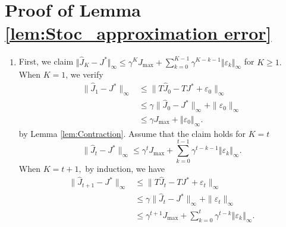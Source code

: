 \documentclass[12pt,technote,onecolumn]{IEEEtran}
\begin{document}
\section*{Proof of Lemma \ref{lem:Stoc_approximation error}}
\begin{IEEEproof}
	\begin{enumerate}
		\item First, we claim $\Vert \widehat{J}_{K}-J^{*}\Vert _{\infty}\leq\gamma^{K}J_{\max}+\sum_{k=0}^{K-1}\gamma^{K-k-1}\Vert\varepsilon_{k}\Vert _{\infty}$
		for $K\geq1.$ When $K=1$, we verify
		\begin{equation*}
		\begin{aligned}
		\|\widehat{J}_{1}-J^{*}\|_{\infty}&\leq\|T\widehat{J}_{0}-TJ^{*}+\varepsilon_{0}\|_{\infty}\\
		&\leq\gamma\|\widehat{J}_{0}-J^{*}\|_{\infty}+\|\varepsilon_{0}\|_{\infty}\\
		&\leq\gamma J_{\max}+\left\Vert \varepsilon_{0}\right\Vert _{\infty}.
		\end{aligned}
		\end{equation*}
		by Lemma \ref{lem:Contraction}. Assume that the claim holds for $K=t$
		\[
		\|\widehat{J}_{t}-J^{*}\|_{\infty}\leq\gamma^{t}J_{\max}+\sum_{k=0}^{t-1}\gamma^{t-k-1}\left\Vert \varepsilon_{k}\right\Vert _{\infty}.
		\]
		When $K=t+1,$ by induction, we have
		\begin{equation*}
		\begin{aligned}
		\|\widehat{J}_{t+1}-J^{*}\|_{\infty}&\leq\|T\widehat{J}_{t}-TJ^{*}+\varepsilon_{t}\|_{\infty}\\
		&\leq\gamma\|\widehat{J}_{t}-J^{*}\|_{\infty}+\|\varepsilon_{t}\|_{\infty}\\
		&\leq\gamma^{t+1}J_{\max}+\sum_{k=0}^{t}\gamma^{t-k}\left\Vert \varepsilon_{k}\right\Vert _{\infty}.
		\end{aligned}
		\end{equation*}
		

\end{enumerate}
\end{IEEEproof}
\end{document}
